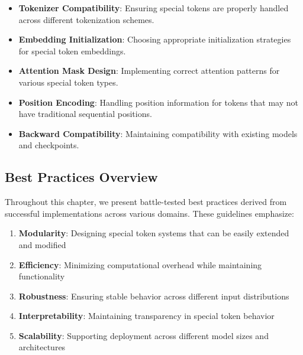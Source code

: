 \begin{itemize}
\item \textbf{Tokenizer Compatibility}: Ensuring special tokens are properly handled across different tokenization schemes.
\item \textbf{Embedding Initialization}: Choosing appropriate initialization strategies for special token embeddings.
\item \textbf{Attention Mask Design}: Implementing correct attention patterns for various special token types.
\item \textbf{Position Encoding}: Handling position information for tokens that may not have traditional sequential positions.
\item \textbf{Backward Compatibility}: Maintaining compatibility with existing models and checkpoints.
\end{itemize}
\begin{comment}
Examples for the above challenges:
- Tokenizer Compatibility: "How do you add a new special token to a pre-trained tokenizer without invalidating its existing vocabulary and embeddings?"
- Attention Mask Design: "How do you create a custom attention mask that allows a 'memory' token to see all other tokens, but prevents other tokens from seeing it?"
\end{comment}

\subsection{Best Practices Overview}

Throughout this chapter, we present battle-tested best practices derived from successful implementations across various domains. These guidelines emphasize:

\begin{enumerate}
\item \textbf{Modularity}: Designing special token systems that can be easily extended and modified
\item \textbf{Efficiency}: Minimizing computational overhead while maintaining functionality
\item \textbf{Robustness}: Ensuring stable behavior across different input distributions
\item \textbf{Interpretability}: Maintaining transparency in special token behavior
\item \textbf{Scalability}: Supporting deployment across different model sizes and architectures
\end{enumerate}

